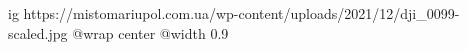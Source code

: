  
 
 
 
 

\ifcmt
  ig https://mistomariupol.com.ua/wp-content/uploads/2021/12/dji_0099-scaled.jpg
  @wrap center
  @width 0.9
\fi

